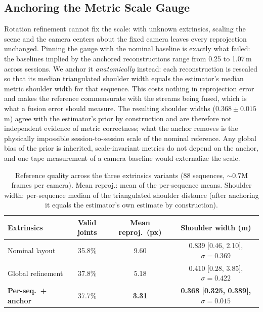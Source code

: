 \documentclass[journal]{IEEEtran}
\newcommand{\best}[1]{\textbf{#1}}
\begin{document}
\subsection{Anchoring the Metric Scale Gauge}
\label{sec:anchor}
Rotation refinement cannot fix the scale: with unknown extrinsics, scaling the scene and the camera centers about the fixed camera leaves every reprojection unchanged. Pinning the gauge with the nominal baseline is exactly what failed: the baselines implied by the anchored reconstructions range from 0.25 to 1.07\,m across sessions. We anchor it \emph{anatomically} instead: each reconstruction is rescaled so that its median triangulated shoulder width equals the estimator's median metric shoulder width for that sequence. This costs nothing in reprojection error and makes the reference commensurate with the streams being fused, which is what a fusion error should measure. The resulting shoulder widths ($0.368\pm0.015$\,m) agree with the estimator's prior by construction and are therefore not independent evidence of metric correctness; what the anchor removes is the physically impossible session-to-session scale of the nominal reference. Any global bias of the prior is inherited, scale-invariant metrics do not depend on the anchor, and one tape measurement of a camera baseline would externalize the scale.

\begin{table}[t]
\centering
\caption{Reference quality across the three extrinsics variants (88 sequences, $\sim$0.7M frames per camera). Mean reproj.: mean of the per-sequence means. Shoulder width: per-sequence median of the triangulated shoulder distance (after anchoring it equals the estimator's own estimate by construction).}
\label{tab:gtquality}
\scriptsize
\setlength{\tabcolsep}{2.4pt}
\begin{tabular}{lccc}
\toprule
Extrinsics & Valid joints & Mean reproj.\ (px) & Shoulder width (m) \\
\midrule
Nominal layout & 35.8\% & 9.60 & 0.839 [0.46, 2.10], $\sigma{=}0.369$ \\
Global refinement & 37.8\% & 5.18 & 0.410 [0.28, 3.85], $\sigma{=}0.422$ \\
\textbf{Per-seq.\ + anchor} & 37.7\% & \best{3.31} & \best{0.368 [0.325, 0.389], $\sigma{=}0.015$} \\
\bottomrule
\end{tabular}
\end{table}
\end{document}
